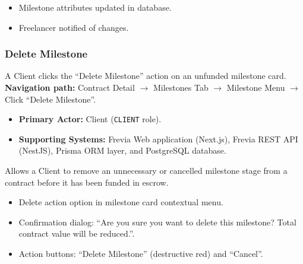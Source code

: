 \begin{itemize}[leftmargin=1.6em,topsep=3pt,itemsep=2pt,parsep=0pt,label=$\bullet$]
      \item Milestone attributes updated in database.
      \item Freelancer notified of changes.
\end{itemize}

\subsubsection{ Delete Milestone}

A Client clicks the ``Delete Milestone'' action on an unfunded milestone card.\newline
\textbf{Navigation path:} Contract Detail $\rightarrow$ Milestones Tab $\rightarrow$ Milestone Menu $\rightarrow$ Click ``Delete Milestone''.


\begin{itemize}[leftmargin=1.6em,topsep=3pt,itemsep=2pt,parsep=0pt,label=$\bullet$]
      \item \textbf{Primary Actor:} Client (\texttt{CLIENT} role).
      \item \textbf{Supporting Systems:} Frevia Web application (Next.js), Frevia REST API (NestJS), Prisma ORM layer, and PostgreSQL database.
\end{itemize}

\noindent Allows a Client to remove an unnecessary or cancelled milestone stage from a contract before it has been funded in escrow.

\begin{itemize}[leftmargin=1.6em,topsep=3pt,itemsep=2pt,parsep=0pt,label=$\bullet$]
      \item Delete action option in milestone card contextual menu.
      \item Confirmation dialog: ``Are you sure you want to delete this milestone? Total contract value will be reduced.''.
      \item Action buttons: ``Delete Milestone'' (destructive red) and ``Cancel''.
\end{itemize}

